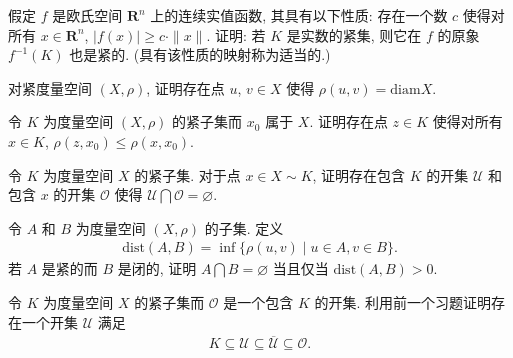 \documentclass[../../main.tex]{subfiles}
\begin{document}
\begin{exercise}\label{exercise:ch09-69}
假定 $f$ 是欧氏空间 $\mathbf{R}^{n}$ 上的连续实值函数, 其具有以下性质: 存在一个数 $c$ 使得对所有 $x\in\mathbf{R}^{n}$, $|f(x)|\geqslant c\cdot\|x\|$. 证明: 若 $K$ 是实数的紧集, 则它在 $f$ 的原象 $f^{-1}(K)$ 也是紧的. (具有该性质的映射称为适当的.)
\end{exercise}

\begin{exercise}\label{exercise:ch09-70}
对紧度量空间 $(X,\rho)$, 证明存在点 $u$, $v\in X$ 使得 $\rho(u,v)=\mathrm{diam}X$.
\end{exercise}

\begin{exercise}\label{exercise:ch09-71}
令 $K$ 为度量空间 $(X,\rho)$ 的紧子集而 $x_{0}$ 属于 $X$. 证明存在点 $z\in K$ 使得对所有 $x\in K$, $\rho(z,x_{0})\leqslant\rho(x,x_{0})$.
\end{exercise}

\begin{exercise}\label{exercise:ch09-72}
令 $K$ 为度量空间 $X$ 的紧子集. 对于点 $x\in X\sim K$, 证明存在包含 $K$ 的开集 $\mathcal{U}$ 和包含 $x$ 的开集 $\mathcal{O}$ 使得 $\mathcal{U}\bigcap\mathcal{O}=\varnothing $.
\end{exercise}

\begin{exercise}\label{exercise:ch09-73}
令 $A$ 和 $B$ 为度量空间 $(X,\rho)$ 的子集. 定义
\begin{align*}
\mathrm{dist}(A,B)=\inf\{\rho(u,v)\mid u\in A,v\in B\}.
\end{align*}
若 $A$ 是紧的而 $B$ 是闭的, 证明 $A\bigcap B=\varnothing $ 当且仅当 $\mathrm{dist}(A,B)>0$.
\end{exercise}

\begin{exercise}\label{exercise:ch09-74}
令 $K$ 为度量空间 $X$ 的紧子集而 $\mathcal{O}$ 是一个包含 $K$ 的开集. 利用前一个习题证明存在一个开集 $\mathcal{U}$ 满足
\begin{align*}
K\subseteq\mathcal{U}\subseteq\overline{\mathcal{U}}\subseteq\mathcal{O}.
\end{align*}
\end{exercise}
\end{document}
